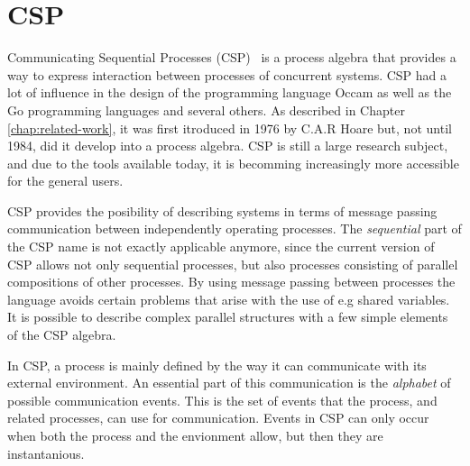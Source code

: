 \newpage
\section{CSP}
\label{sec:csp_background}
Communicating Sequential Processes (CSP)~\cite{Hoare1978} is a process algebra that provides a way to express interaction between processes of concurrent systems.
CSP had a lot of influence in the design of the programming language Occam as well as the Go programming languages and several others. As described in Chapter \ref{chap:related-work}, it was first itroduced in 1976 by C.A.R Hoare but, not until 1984, did it develop into a process algebra. CSP is still a large research subject, and due to the tools available today, it is becomming increasingly more accessible for the general users.

CSP provides the posibility of describing systems in terms of message passing communication between independently operating processes. The \textit{sequential} part of the CSP name is not exactly applicable anymore, since the current version of CSP allows not only sequential processes, but also processes consisting of parallel compositions of other processes.
By using message passing between processes the language avoids certain problems that arise with the use of e.g shared variables.
It is possible to describe complex parallel structures with a few simple elements of the CSP algebra.

In CSP, a process is mainly defined by the way it can communicate with its external environment. An essential part of this communication is the \textit{alphabet} of possible communication events. This is the set of events that the process, and related processes, can use for communication. Events in CSP can only occur when both the process and the envionment allow, but then they are instantanious.

